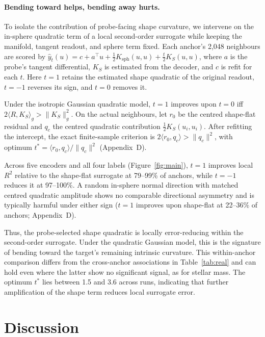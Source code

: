 \documentclass{article}
\begin{document}
\paragraph{Bending toward helps, bending away hurts.}
To isolate the contribution of probe-facing
shape curvature, we intervene on the
in-sphere quadratic term of a local
second-order surrogate while keeping the
manifold, tangent readout, and sphere term
fixed. Each anchor's 2{,}048 neighbours
are scored by
$\hat y_t(u)=c+a^\top u+
\tfrac12K_{\mathrm{sph}}(u,u)+
\tfrac t2K_S(u,u)$,
where $a$ is the probe's tangent
differential, $K_S$ is estimated from the
decoder, and $c$ is refit for each $t$.
Here $t=1$ retains the estimated shape
quadratic of the original readout,
$t=-1$ reverses its sign, and $t=0$
removes it.

Under the isotropic Gaussian quadratic
model, $t=1$ improves upon $t=0$ iff
$2\langle R,K_S\rangle_g>\|K_S\|_g^2$.
On the actual neighbours, let $r_0$ be
the centred shape-flat residual and
$q_c$ the centred quadratic contribution
$\tfrac12K_S(u_i,u_i)$. After refitting
the intercept, the exact finite-sample
criterion is
$2\langle r_0,q_c\rangle>\|q_c\|^2$,
with optimum
$t^*=\langle r_0,q_c\rangle/\|q_c\|^2$
(Appendix~D).

Across five encoders and all four labels
(Figure~\ref{fig:main}), $t=1$ improves
local $R^2$ relative to the shape-flat
surrogate at 79--99\% of anchors, while
$t=-1$ reduces it at 97--100\%.
A random in-sphere normal direction with
matched centred quadratic amplitude shows
no comparable directional asymmetry and
is typically harmful under either sign
($t=1$ improves upon shape-flat at
22--36\% of anchors; Appendix~D).

Thus, the probe-selected shape quadratic
is locally error-reducing within the
second-order surrogate. Under the quadratic
Gaussian model, this is the signature of
bending toward the target's remaining
intrinsic curvature. This within-anchor
comparison differs from the cross-anchor
associations in Table~\ref{tab:real}
and can hold even where the latter show
no significant signal, as for stellar mass.
The optimum $t^*$ lies between 1.5 and
3.6 across runs, indicating that further
amplification of the shape term reduces
local surrogate error. 

\section{Discussion}
\end{document}

